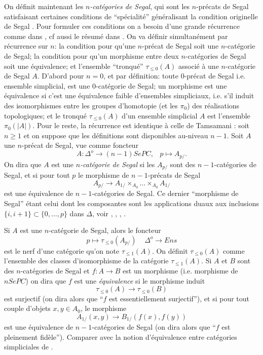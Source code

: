 \documentclass[12pt]{article}
\begin{document}
On d\'efinit maintenant les {\em
$n$-cat\'egories de Segal}, qui sont les $n$-pr\'ecats de Segal satisfaisant
certaines conditions de ``sp\'ecialit\'e'' g\'en\'eralisant la condition
originelle
de Segal \cite{Segal}. Pour formuler ces conditions on a besoin d'une grande
r\'ecurrence comme dans \cite{Tamsamani}, cf aussi le r\'esum\'e dans
\cite{limits}. On va d\'efinir simultan\'ement par r\'ecurrence sur $n$: la
condition pour qu'une $n$-pr\'ecat de Segal soit une $n$-cat\'egorie de
Segal; la condition pour qu'un morphisme entre deux $n$-cat\'egories de
Segal soit une \'equivalence; et l'ensemble ``tronqu\'e''
$\tau _{\leq 0}(A)$ associ\'e \`a une
$n$-cat\'egorie de Segal $A$. D'abord pour $n=0$, et par d\'efinition:
 toute $0$-pr\'ecat de Segal i.e.
ensemble simplicial, est une $0$-cat\'egorie de Segal; un morphisme est une
\'equivalence si c'est une \'equivalence faible d'ensembles simpliciaux, i.e.
s'il induit des isomorphismes entre les groupes d'homotopie (et les $\pi
_0$) des
r\'ealisations topologiques; et le tronqu\'e $\tau _{\leq 0}(A)$ d'un ensemble
simplicial $A$ est l'ensemble $\pi _0(|A|)$. Pour le reste, la r\'ecurrence est
identique \`a celle de Tamsamani \cite{Tamsamani}:  soit $n\geq 1$ et on suppose
que les d\'efinitions sont disponibles au-niveau $n-1$. Soit $A$ une
$n$-pr\'ecat de
Segal, vue comme foncteur
$$
A: \Delta ^o\rightarrow (n-1)SePC,\;\;\; p\mapsto A_{p/}.
$$
On dira que $A$ est une {\em $n$-cat\'egorie de Segal} si les
$A_{p/}$ sont des $n-1$-cat\'egories de Segal, et si pour tout $p$ le morphisme
de $n-1$-pr\'ecats de Segal
$$
A_{p/}\rightarrow A_{1/}\times _{A_0} \ldots \times _{A_0}A_{1/}
$$
est une \'equivalence de $n-1$-cat\'egories de Segal. Ce dernier
``morphisme de Segal'' \'etant celui dont les composantes sont les applications
duaux aux inclusions $\{ i,i+1\} \subset \{ 0,\ldots , p\}$ dans $\Delta$,
voir \cite{SegalInventiones}, \cite{Adams}, \cite{Dunn}, \cite{Tamsamani}.


Si $A$ est une $n$-cat\'egorie de Segal, alors le foncteur
$$
p\mapsto \tau _{\leq 0} (A_{p/}) \;\;\;\; \Delta ^o \rightarrow Ens
$$
est le nerf d'une cat\'egorie qu'on note $\tau _{\leq 1}(A)$. On
d\'efinit $\tau _{\leq 0}(A)$ comme l'ensemble des classes d'isomorphisme de la
cat\'egorie $\tau _{\leq 1}(A)$. Si $A$ et $B$ sont des $n$-cat\'egories de
Segal
et $f:A\rightarrow B$ est un morphisme (i.e. morphisme de $nSePC$) on dira que
$f$ est une {\em \'equivalence} si le morphisme induit
$$
\tau _{\leq 0}(A)\rightarrow \tau _{\leq 0}(B)
$$
est surjectif (on dira alors que ``$f$ est essentiellement surjectif''), et
si pour
tout couple d'objets $x,y\in A_0$, le morphisme
$$
A_{1/}(x,y)\rightarrow B_{1/}(f(x), f(y))
$$
est une \'equivalence de $n-1$-cat\'egories de Segal (on dira alors que
``$f$ est
pleinement fid\`ele''). Comparer avec la notion
d'\'equivalence entre cat\'egories simpliciales de
\cite{DwyerKanDiags}.
\end{document}
